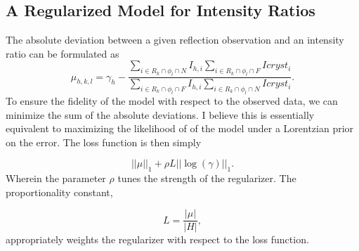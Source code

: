 \documentclass{report}
\begin{document}
\subsection{A Regularized Model for Intensity Ratios}

The absolute deviation between a given reflection observation and an intensity ratio can be formulated as
\begin{equation}\label{eq:reflection_error}
\mu_{h,k,l} = \gamma_h  - \frac {\sum_{i\in R_k \cap \phi_l \cap N} I_{h,i} \sum_{i \in R_k \cap \phi_l \cap F} Icryst_i} {\sum_{i\in R_k \cap \phi_l \cap F} I_{h,i} \sum_{i \in R_k \cap \phi_l \cap N} Icryst_i}.
\end{equation}
To ensure the fidelity of the model with respect to the observed data, we can minimize the sum of the absolute deviations. 
I believe this is essentially equivalent to maximizing the likelihood of of the model under a Lorentzian prior on the error. 
The loss function is then simply 

\begin{equation}
|| \mu ||_1 + \rho L ||\log(\gamma)||_1.
\end{equation}
Wherein the parameter $\rho$ tunes the strength of the regularizer. The proportionality constant, 

\begin{equation}
L = \frac {|\mu|} {|H|},
\end{equation}
appropriately weights the regularizer with respect to the loss function.



\end{document}
